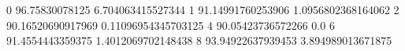 0 96.75830078125 6.704063415527344
1 91.14991760253906 1.0956802368164062
2 90.16520690917969 0.11096954345703125
4 90.05423736572266 0.0
6 91.4554443359375 1.4012069702148438
8 93.94922637939453 3.894989013671875
